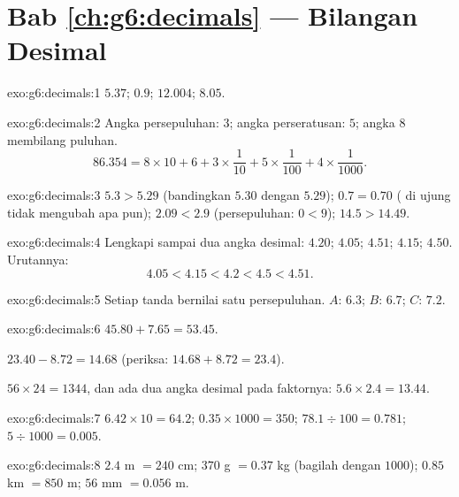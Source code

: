 \section*{Bab \ref{ch:g6:decimals} --- Bilangan Desimal}

\begin{solution}{exo:g6:decimals:1}
$5.37$; \quad $0.9$; \quad $12.004$; \quad $8.05$.
\end{solution}

\begin{solution}{exo:g6:decimals:2}
Angka persepuluhan: $3$; angka perseratusan: $5$; angka $8$ membilang puluhan.
\[
86.354 = 8 \times 10 + 6 + 3 \times \frac{1}{10} + 5 \times
\frac{1}{100} + 4 \times \frac{1}{1000}.
\]
\end{solution}

\begin{solution}{exo:g6:decimals:3}
$5.3 > 5.29$ (bandingkan $5.30$ dengan $5.29$); \quad
$0.7 = 0.70$ ( di ujung tidak mengubah apa pun); \quad
$2.09 < 2.9$ (persepuluhan: $0 < 9$); \quad
$14.5 > 14.49$.
\end{solution}

\begin{solution}{exo:g6:decimals:4}
Lengkapi sampai dua angka desimal: $4.20$; $4.05$; $4.51$; $4.15$; $4.50$. Urutannya:
\[
4.05 < 4.15 < 4.2 < 4.5 < 4.51 .
\]
\end{solution}

\begin{solution}{exo:g6:decimals:5}
Setiap tanda bernilai satu persepuluhan. $A$: $6.3$; \quad $B$: $6.7$; \quad
$C$: $7.2$.
\end{solution}

\begin{solution}{exo:g6:decimals:6}
$45.80 + 7.65 = 53.45$.

$23.40 - 8.72 = 14.68$ (periksa: $14.68 + 8.72 = 23.4$).

$56 \times 24 = 1344$, dan ada dua angka desimal pada faktornya:
$5.6 \times 2.4 = 13.44$.
\end{solution}

\begin{solution}{exo:g6:decimals:7}
$6.42 \times 10 = 64.2$; \quad
$0.35 \times 1000 = 350$; \quad
$78.1 \div 100 = 0.781$; \quad
$5 \div 1000 = 0.005$.
\end{solution}

\begin{solution}{exo:g6:decimals:8}
$2.4$ m $= 240$ cm; \quad $370$ g $= 0.37$ kg (bagilah dengan $1000$);
\quad $0.85$ km $= 850$ m; \quad $56$ mm $= 0.056$ m.
\end{solution}

